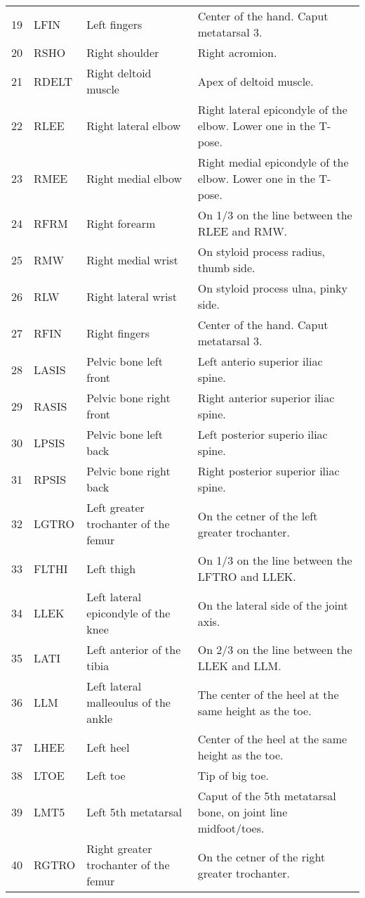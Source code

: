 \documentclass{article}
\begin{document}
\begin{table}
\begin{tabular}{rlll}
    19 & LFIN & Left fingers & Center of the hand. Caput metatarsal 3. \\
    20 & RSHO & Right shoulder & Right acromion. \\
    21 & RDELT & Right deltoid muscle & Apex of deltoid muscle. \\
    22 & RLEE & Right lateral elbow & Right lateral epicondyle of the elbow. Lower one in the T-pose. \\
    23 & RMEE & Right medial elbow & Right medial epicondyle of the elbow. Lower one in the T-pose. \\
    24 & RFRM & Right forearm & On 1/3 on the line between the RLEE and RMW. \\
    25 & RMW & Right medial wrist & On styloid process radius, thumb side. \\
    26 & RLW & Right lateral wrist & On styloid process ulna, pinky side. \\
    27 & RFIN & Right fingers & Center of the hand. Caput metatarsal 3. \\
    28 & LASIS & Pelvic bone left front & Left anterio superior iliac spine. \\
    29 & RASIS & Pelvic bone right front & Right anterior superior iliac spine. \\
    30 & LPSIS & Pelvic bone left back & Left posterior superio iliac spine. \\
    31 & RPSIS & Pelvic bone right back & Right posterior superior iliac spine. \\
    32 & LGTRO & Left greater trochanter of the femur & On the cetner of the left greater trochanter. \\
    33 & FLTHI & Left thigh & On 1/3 on the line between the LFTRO and LLEK. \\
    34 & LLEK & Left lateral epicondyle of the knee & On the lateral side of the joint axis. \\
    35 & LATI & Left anterior of the tibia & On 2/3 on the line between the LLEK and LLM. \\
    36 & LLM & Left lateral malleoulus of the ankle & The center of the heel at the same height as the toe. \\
    37 & LHEE & Left heel & Center of the heel at the same height as the toe. \\
    38 & LTOE & Left toe & Tip of big toe. \\
    39 & LMT5 & Left 5th metatarsal & Caput of the 5th metatarsal bone, on joint line midfoot/toes. \\
    40 & RGTRO & Right greater trochanter of the femur & On the cetner of the right greater trochanter. \\

\end{tabular}
\end{table}
\end{document}
